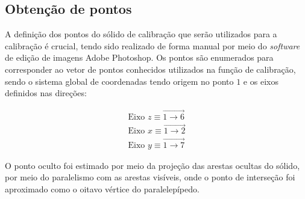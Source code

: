 \subsection{Obtenção de pontos}

A definição dos pontos do sólido de calibração que serão utilizados para a calibração é crucial, tendo sido realizado de forma manual por meio do \textit{software} de edição de imagens Adobe Photoshop. Os pontos são enumerados para corresponder ao vetor de pontos conhecidos utilizados na função de calibração, sendo o sistema global de coordenadas tendo origem no ponto $\mathit{1}$ e os eixos definidos nas direções:

\begin{align}
	\text{Eixo } z \equiv \overrightarrow{\mathit{1} \to \mathit{6}} \\
	\text{Eixo } x \equiv \overrightarrow{\mathit{1} \to \mathit{2}} \\
	\text{Eixo } y \equiv \overrightarrow{\mathit{1} \to \mathit{7}}
\end{align}

O ponto oculto foi estimado por meio da projeção das arestas ocultas do sólido, por meio do paralelismo com as arestas visíveis, onde o ponto de interseção foi aproximado como o oitavo vértice do paralelepípedo.

